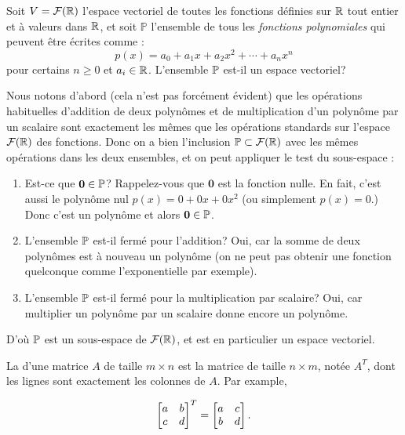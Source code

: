 \begin{myprob}
Soit $V = \mathcal{F}(\mathbb{R})$ l'espace vectoriel de toutes les fonctions d\'efinies sur $\mathbb{R}$ tout entier et à valeurs dans $\mathbb{R}$, et soit $\mathbb{P}$ l'ensemble de tous les \emph{fonctions
polynomiales} qui peuvent être écrites comme :
\[p(x) = a_0 + a_1 x + a_2 x^2 + \cdots + a_n x^n\] pour certains
$n \geq 0$ et $a_i \in \mathbb{R}$. L'ensemble $\mathbb{P}$ est-il un espace vectoriel?

\begin{mysol}
Nous notons d'abord (cela n'est pas forcément évident) que les
opérations habituelles d'addition de deux polynômes et de multiplication d'un polynôme
par un scalaire sont exactement les mêmes que les opérations standards sur l'espace  $\mathcal{F}(\mathbb{R})$ des 
fonctions. Donc on a bien l'inclusion $\mathbb{P} \subset \mathcal{F}(\mathbb{R})$ avec les mêmes
opérations dans les deux ensembles, et on peut appliquer le test du sous-espace :

\begin{enumerate}
\item
  Est-ce que $\mathbf 0 \in \mathbb{P}$? Rappelez-vous que $\mathbf 0$ est la
  fonction nulle. En fait, c'est aussi le polynôme nul
  $p(x) = 0 + 0x + 0x^2$ (ou simplement $p(x) = 0$.)
  Donc c'est un polynôme et alors $\mathbf 0 \in \mathbb{P}$.
\item
  L'ensemble $\mathbb{P}$ est-il fermé pour l'addition? Oui, car la somme de deux
  polynômes est à nouveau un polynôme (on ne peut pas obtenir une fonction quelconque comme l'exponentielle par exemple).
\item
  L'ensemble $\mathbb{P}$ est-il fermé pour la multiplication par scalaire? Oui, car multiplier un
  polynôme par un scalaire donne encore un polynôme.
\end{enumerate}

D'o\`u $\mathbb{P}$ est un sous-espace de $\mathcal{F}(\mathbb{R})$, et est en particulier un espace vectoriel.

\end{mysol}
\end{myprob}

\begin{definition}\label{transpose}  
La  d'une matrice
 $A$ de taille $m\times n$ est la matrice de taille $n \times m$, not\'ee $A^T$, dont les
lignes sont exactement les colonnes de $A$. Par example,

\[\left[ \begin{matrix} a&b\\c&d \end{matrix} \right]^T = \left[ \begin{matrix} a&c\\b&d \end{matrix} \right].\]
\end{definition}


